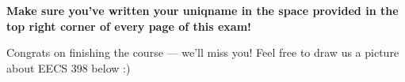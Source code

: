 \documentclass[twoside,12pt]{article}
\begin{document}
\begin{probset}
\begin{prob}[(11 pts)]

\end{prob}

\vspace{0.5in}

\newpage

\textbf{Make sure you've written your uniqname in the space provided in the top right corner of every page of this exam!}

Congrats on finishing the course --- we'll miss you! Feel free to draw us a picture about EECS 398 below :)


\begin{responsebox}{7in}
    
\end{responsebox}

\end{probset}
\end{document}
